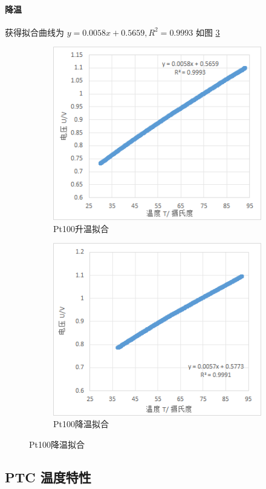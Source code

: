 \documentclass[a4paper]{../phyreport}
\begin{document}
\paragraph{降温}
获得拟合曲线为 $y=0.0058x+0.5659,R^2=0.9993$ 如图 \ref{fig:pt100dn}
\begin{figure}[H]
\centering
\begin{subfigure}{.5\textwidth}
\includegraphics[width=.8\linewidth]{测量水比热/20240508101831.png}
\caption{\label{fig:pt100up} Pt100升温拟合}
\end{subfigure}\hfil
\begin{subfigure}{.5\textwidth}
\includegraphics[width=.8\linewidth]{测量水比热/20240508104102.png}
\caption{\label{fig:pt100dn} Pt100降温拟合}
\end{subfigure}
\end{figure}


\subsection{PTC 温度特性}
\end{document}
